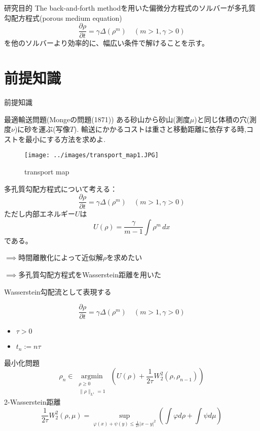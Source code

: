\documentclass[dvipdfmx, 12pt]{beamer}
\begin{document}
\begin{frame}{研究目的}
    The back-and-forth method\cite{MR4238775}を用いた偏微分方程式のソルバーが多孔質勾配方程式(porous medium equation)
    \[
        \frac{\partial \rho}{\partial t} = \gamma \Delta(\rho^m) \quad (m > 1, \gamma > 0)
    \]
    を他のソルバーより効率的に、幅広い条件で解けることを示す。
\end{frame}

\section{前提知識}
\begin{frame}{前提知識}
    \begin{block}{最適輸送問題(Mongeの問題(1871))}
        ある砂山から砂山(測度$\mu$)と同じ体積の穴(測度$\nu$)に砂を運ぶ(写像$T$).
        輸送にかかるコストは重さと移動距離に依存する時,コストを最小にする方法を求めよ.
    \end{block}
    \begin{figure}[htbp]
        \begin{center}
            \texttt{[image: ../images/transport\_map1.JPG]}
            \caption{transport map}
        \end{center}
    \end{figure}
\end{frame}

\begin{frame}{}
    多孔質勾配方程式について考える：
    \[
        \frac{\partial \rho}{\partial t} = \gamma \Delta(\rho^m) \quad (m > 1, \gamma > 0)
    \]
    ただし内部エネルギー$U$は
    \[
        U(\rho) = \frac{\gamma}{m-1} \int \rho^m \,dx
    \]
    である。

    \vspace\baselineskip 
    $\implies $時間離散化によって近似解$\rho$を求めたい

    \vspace\baselineskip 
    $\implies $多孔質勾配方程式をWasserstein距離を用いた
    
    Wasserstein勾配流として表現する

\end{frame}


\begin{frame}{}
    \[
    \frac{\partial \rho}{\partial t} = \gamma \Delta(\rho^m) \quad (m > 1, \gamma > 0)
    \]
    \vspace\baselineskip 
    \begin{itemize}
        \item $\tau > 0$
        \item $t_n := n \tau$
    \end{itemize}
    \vspace\baselineskip 
    最小化問題
    \[
        \rho_n \in \underset{{\substack{\rho \ge 0 \\ \|\rho\|_{L^1} = 1}}}{\operatorname{argmin}}\, \left(U(\rho) + \frac{1}{2\tau} W_2^2(\rho, \rho_{n-1})\right)
    \]
    2-Wasserstein距離
    \[
        \frac{1}{2\tau} W_2^2(\rho, \mu) = \sup_{\varphi(x) + \psi(y) \leq \frac{1}{2 \tau} |x - y|^2} \left( \int \varphi d\rho + \int \psi d\mu \right)
    \]
\end{frame}
\end{document}
